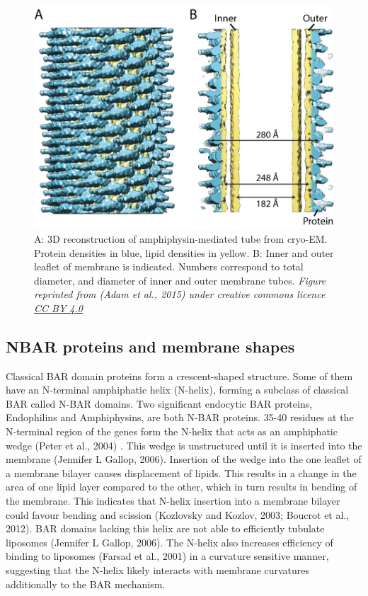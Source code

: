 \begin{figure}[H]
	\centering
\includegraphics[scale=0.36]{figures/intro/BAR_scaffold}
\caption[BAR domain scaffolds]
{A: 3D reconstruction of amphiphysin-mediated tube from cryo-EM. Protein densities in blue, lipid densities in yellow. B: Inner and outer leaflet of membrane is indicated. Numbers correspond to total diameter, and diameter of inner and outer membrane tubes. \textit{Figure reprinted from (Adam et al., 2015) under creative commons licence \href{https://creativecommons.org/licenses/by/4.0/}{CC BY 4.0}}
\label{intro_barscaffold}}
	\end{figure}



	\subsection{NBAR proteins and membrane shapes}	
Classical BAR domain proteins form a crescent-shaped structure. Some of them have an N-terminal amphiphatic helix (N-helix), forming a subclass of classical BAR called N-BAR domains. Two significant endocytic BAR proteins, Endophilins and Amphiphysins, are both N-BAR proteins. 35-40 residues at the N-terminal region of the genes form the N-helix that acts as an amphiphatic wedge (Peter et al., 2004) . This wedge is unstructured until it is inserted into the membrane (Jennifer L Gallop, 2006). Insertion of the wedge into the one leaflet of a membrane bilayer causes displacement of lipids. This results in a change in the area of one lipid layer compared to the other, which in turn results in bending of the membrane. This indicates that N-helix insertion into a membrane bilayer could favour bending and scission (Kozlovsky and Kozlov, 2003; Boucrot et al., 2012). BAR domains lacking this helix are not able to efficiently tubulate  liposomes (Jennifer L Gallop, 2006). The N-helix also increases efficiency of binding to liposomes (Farsad et al., 2001) in a curvature sensitive manner, suggesting that the N-helix likely interacts with membrane curvatures additionally to the BAR mechanism. 


